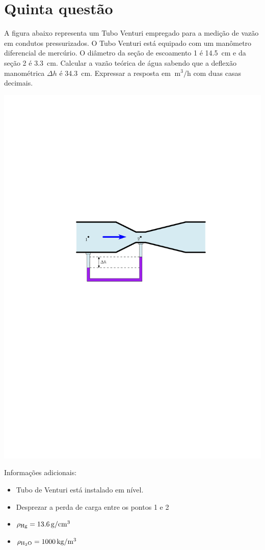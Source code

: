 \documentclass[a4paper, 12pt, brazilian]{article}
\begin{document}
	\section{Quinta questão}
	A figura abaixo representa um Tubo Venturi empregado para a medição de vazão em condutos pressurizados. O Tubo Venturi está equipado com um manômetro diferencial de mercúrio. O diâmetro da seção de escoamento 1 é \SI{14.5}{\centi\meter} e da seção 2 é \SI{3.3}{\centi\meter}. Calcular a vazão teórica de água sabendo que a deflexão manométrica $\Delta h$ é \SI{34.3}{\centi\meter}. Expressar a resposta em $\SI{}{\meter^{3}/\hour}$ com duas casas decimais.
	\begin{center}
		\includegraphics[width=.9\linewidth]{assets/images/ex5}
	\end{center}
	\noindent Informações adicionais:
	\begin{itemize}
		\item Tubo de Venturi está instalado em nível.
		\item Desprezar a perda de carga entre os pontos 1 e 2 
		\item $\rho_{\ce{Hg}}=\SI{13.6}{\gram/\centi\meter^{3}}$
		\item $\rho_{\ce{H2O}}=\SI{1000}{\kilogram/\meter^{3}}$
	\end{itemize}
\end{document}
